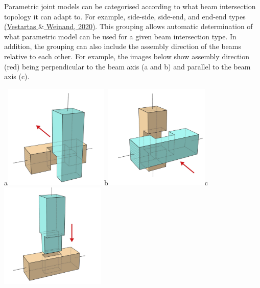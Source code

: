 \documentclass[11pt]{book}
\begin{document}
\begin{flushleft}
Parametric joint models can be categorised according to what beam intersection topology it can adapt to. For example, side-side, side-end, and end-end types \href{https://www.zotero.org/google-docs/?SzXV4K}{(Vestartas $\&$ Weinand, 2020)}{\footnotesize .} This grouping allows automatic determination of what parametric model can be used for a given beam intersection type. In addition, the grouping can also include the assembly direction of the beams relative to each other. For example, the images below show assembly direction (red) being perpendicular to the beam axis (a and b) and parallel to the beam axis (c).
\end{flushleft}


\begin{flushleft}
{\footnotesize a\includegraphics[width=5.0cm,height=5.0cm]{./images/image21.jpg}b\includegraphics[width=5.0cm,height=5.0cm]{./images/image22.jpg}c\includegraphics[width=5.0cm,height=5.0cm]{./images/image20.jpg}}
\end{flushleft}
\end{document}

